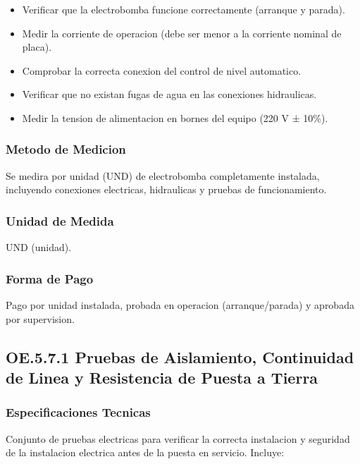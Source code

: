 \begin{itemize}
  \item Verificar que la electrobomba funcione correctamente (arranque y parada).
  \item Medir la corriente de operacion (debe ser menor a la corriente nominal de placa).
  \item Comprobar la correcta conexion del control de nivel automatico.
  \item Verificar que no existan fugas de agua en las conexiones hidraulicas.
  \item Medir la tension de alimentacion en bornes del equipo (220 V ± 10\%).
\end{itemize}

\subsubsection{Metodo de Medicion}

Se medira por unidad (UND) de electrobomba completamente instalada, incluyendo conexiones electricas, hidraulicas y pruebas de funcionamiento.

\subsubsection{Unidad de Medida}

UND (unidad).

\subsubsection{Forma de Pago}

Pago por unidad instalada, probada en operacion (arranque/parada) y aprobada por supervision.

\subsection{OE.5.7.1 Pruebas de Aislamiento, Continuidad de Linea y Resistencia de Puesta a Tierra}

\subsubsection{Especificaciones Tecnicas}

Conjunto de pruebas electricas para verificar la correcta instalacion y seguridad de la instalacion electrica antes de la puesta en servicio. Incluye:

